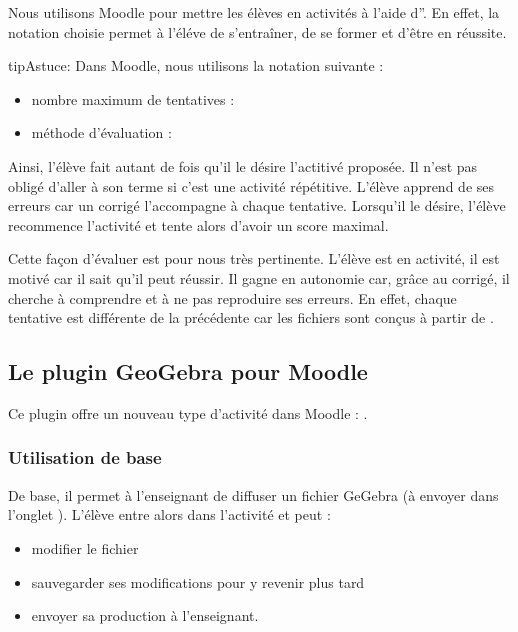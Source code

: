 \documentclass[letterpaper,10pt,french]{sphinxmanual}
\begin{document}
Nous utilisons Moodle pour mettre les élèves en activités à l’aide d”. En effet, la notation choisie permet à l’éléve de s’entraîner, de se
former et d’être en réussite.

\begin{sphinxadmonition}{tip}{Astuce:}
Dans Moodle, nous utilisons la notation suivante :
\begin{itemize}
\item {} 
nombre maximum de tentatives : 

\item {} 
méthode d’évaluation : 

\end{itemize}

\noindent{}
\end{sphinxadmonition}

Ainsi, l’élève fait autant de fois qu’il le désire l’actitivé proposée. Il n’est pas
obligé d’aller à son terme si c’est une activité répétitive. L’élève apprend de ses
erreurs car un corrigé l’accompagne à chaque tentative. Lorsqu’il le désire, l’élève
recommence l’activité et tente alors d’avoir un score maximal.

Cette façon d’évaluer est pour nous très pertinente.
L’élève est en activité, il est motivé car il sait qu’il peut réussir.
Il gagne en autonomie car, grâce au corrigé, il cherche à comprendre et à ne pas
reproduire ses erreurs.
En effet, chaque tentative est différente de la précédente car les fichiers sont
conçus à partir de .


\subsection{Le plugin GeoGebra pour Moodle}
\label{\detokenize{projet-description:le-plugin-geogebra-pour-moodle}}
Ce plugin offre un nouveau type d’activité dans Moodle : .


\subsubsection{Utilisation de base}
\label{\detokenize{projet-description:utilisation-de-base}}
De base, il permet à l’enseignant de diffuser un fichier GeGebra (à envoyer dans
l’onglet ).
L’élève entre alors dans l’activité et peut :
\begin{itemize}
\item {} 
modifier le fichier

\item {} 
sauvegarder ses modifications pour y revenir plus tard

\item {} 
envoyer sa production à l’enseignant.

\end{itemize}
\end{document}
